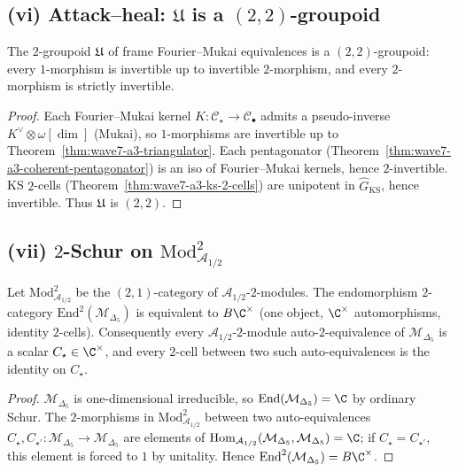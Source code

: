 \subsection*{(vi) Attack--heal: $\mathfrak{U}$ is a $(2,2)$-groupoid}

\begin{theorem}
\label{thm:wave7-a3-22-groupoid}
\ClaimStatusTheorem
The $2$-groupoid $\mathfrak{U}$ of frame Fourier--Mukai equivalences
is a $(2,2)$-groupoid: every $1$-morphism is invertible up to
invertible $2$-morphism, and every $2$-morphism is strictly
invertible.
\end{theorem}

\begin{proof}
Each Fourier--Mukai kernel $K : \mathcal{C}_\star \to \mathcal{C}_\bullet$
admits a pseudo-inverse $K^\vee \otimes \omega[\dim]$ (Mukai), so
$1$-morphisms are invertible up to
Theorem~\ref{thm:wave7-a3-triangulator}. Each pentagonator
(Theorem~\ref{thm:wave7-a3-coherent-pentagonator}) is an iso of
Fourier--Mukai kernels, hence $2$-invertible. KS $2$-cells
(Theorem~\ref{thm:wave7-a3-ks-2-cells}) are unipotent in
$\widehat{G}_{\mathrm{KS}}$, hence invertible. Thus $\mathfrak{U}$ is
$(2,2)$.
\end{proof}

\subsection*{(vii) $2$-Schur on $\mathrm{Mod}^{\mathrm{2}}_{\mathcal{A}_{1/2}}$}

\begin{theorem}
\label{thm:wave7-a3-2-schur}
\ClaimStatusTheorem
Let $\mathrm{Mod}^{\mathrm{2}}_{\mathcal{A}_{1/2}}$ be the
$(2,1)$-category of $\mathcal{A}_{1/2}$-$2$-modules. The
endomorphism $2$-category
$\mathrm{End}^{\mathrm{2}}(\mathcal{M}_{\Delta_5})$
is equivalent to $B\C^\times$ (one object, $\C^\times$ automorphisms,
identity $2$-cells). Consequently every $\mathcal{A}_{1/2}$-$2$-module
auto-$2$-equivalence of $\mathcal{M}_{\Delta_5}$ is a scalar
$C_\star \in \C^\times$, and every $2$-cell between two such
auto-equivalences is the identity on $C_\star$.
\end{theorem}

\begin{proof}
$\mathcal{M}_{\Delta_5}$ is one-dimensional irreducible, so
$\mathrm{End}(\mathcal{M}_{\Delta_5}) = \C$ by ordinary Schur.
The $2$-morphisms in
$\mathrm{Mod}^{\mathrm{2}}_{\mathcal{A}_{1/2}}$
between two auto-equivalences $C_\star, C_{\star'} : \mathcal{M}_{\Delta_5}
\to \mathcal{M}_{\Delta_5}$ are elements of
$\mathrm{Hom}_{\mathcal{A}_{1/2}}(\mathcal{M}_{\Delta_5}, \mathcal{M}_{\Delta_5}) = \C$;
if $C_\star = C_{\star'}$, this element is forced to $1$ by
unitality. Hence $\mathrm{End}^{\mathrm{2}}(\mathcal{M}_{\Delta_5}) = B\C^\times$.
\end{proof}

